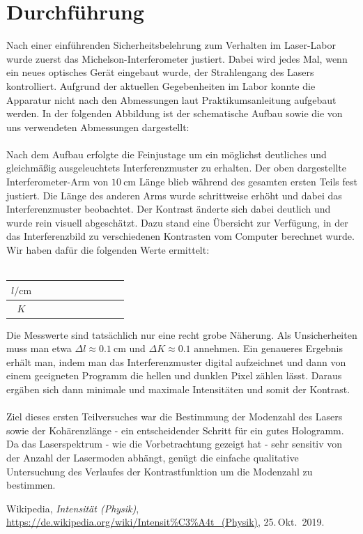 \documentclass[german,  %
parskip=full,  %
]{scrartcl}
\begin{document}
\section{Durchführung}
Nach einer einführenden Sicherheitsbelehrung zum Verhalten im Laser-Labor wurde zuerst das Michelson-Interferometer justiert. Dabei wird jedes Mal, wenn ein neues optisches Gerät eingebaut wurde, der Strahlengang des Lasers kontrolliert. Aufgrund der aktuellen Gegebenheiten im Labor konnte die Apparatur nicht nach den Abmessungen laut Praktikumsanleitung aufgebaut werden. In der folgenden Abbildung ist der schematische Aufbau sowie die von uns verwendeten Abmessungen dargestellt: \\\\
Nach dem Aufbau erfolgte die Feinjustage um ein möglichst deutliches und gleichmäßig ausgeleuchtets Interferenzmuster zu erhalten. Der oben dargestellte Interferometer-Arm von \(10 \ \mathrm{cm}\) Länge blieb während des gesamten ersten Teils fest justiert. Die Länge des anderen Arms wurde schrittweise erhöht und dabei das Interferenzmuster beobachtet. Der Kontrast änderte sich dabei deutlich und wurde rein visuell abgeschätzt. Dazu stand eine Übersicht zur Verfügung, in der das Interferenzbild zu verschiedenen Kontrasten vom Computer berechnet wurde. Wir haben dafür die folgenden Werte ermittelt: \\\\
\begin{table}\centering
\begin{tabular}{|c|c|c|c|c|c|c|c|c|c|}\hline
\(l / \mathrm{cm}\) & & & & & & & & &  \\\hline
\(K\) & & & & & & & & & \\\hline
\end{tabular}
\end{table}
Die Messwerte sind tatsächlich nur eine recht grobe Näherung. Als Unsicherheiten muss man etwa \(\Delta l \approx 0.1 \ \mathrm{cm}\) und \(\Delta K \approx 0.1\) annehmen. Ein genaueres Ergebnis erhält man, indem man das Interferenzmuster digital aufzeichnet und dann von einem geeigneten Programm die hellen und dunklen Pixel zählen lässt. Daraus ergäben sich dann minimale und maximale Intensitäten und somit der Kontrast. \\\\
Ziel dieses ersten Teilversuches war die Bestimmung der Modenzahl des Lasers sowie der Kohärenzlänge - ein entscheidender Schritt für ein gutes Hologramm. Da das Laserspektrum - wie die Vorbetrachtung gezeigt hat - sehr sensitiv von der Anzahl der Lasermoden abhängt, genügt die einfache qualitative Untersuchung des Verlaufes der Kontrastfunktion um die Modenzahl zu bestimmen.
    \begin{thebibliography}{9}
    Wikipedia,
    \emph{Intensität (Physik)},
    \url{https://de.wikipedia.org/wiki/Intensit%C3%A4t_(Physik)},
    25.\,Okt.~2019.
    \end{thebibliography}

\end{document}
